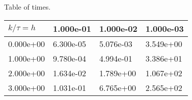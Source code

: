 \begin{center}
Table of times.
  
\begin{tabular}{|p{1in}|p{1in}|p{1in}|p{1in}|} \hline
$k / \tau = h$ &1.000e-01 &1.000e-02 &1.000e-03 \\ \hline 
0.000e+00 &6.300e-05 &5.076e-03 &3.549e+00 \\ \hline 
1.000e+00 &9.780e-04 &4.994e-01 &3.386e+01 \\ \hline 
2.000e+00 &1.634e-02 &1.789e+00 &1.067e+02 \\ \hline 
3.000e+00 &1.031e-01 &6.765e+00 &2.565e+02 \\ \hline 

\end{tabular}\\[20pt]
\end{center}
